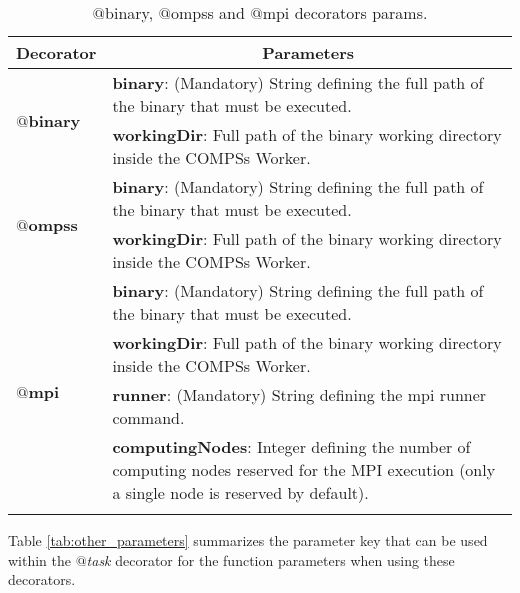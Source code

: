 \bgroup
  \def\arraystretch{1.5}%
  \begin{longtable}{| p{} | p{} |}
    \hline
    \multicolumn{1}{|c|}{{\bf Decorator }} &  \multicolumn{1}{c|}{{\bf Parameters }}\\
    \hline
        \multirow{2}{*}{{\bf $@$binary}} & {\bf binary}: (Mandatory) String defining the full path of the binary that must be executed. \\
                                         & {\bf workingDir}: Full path of the binary working directory inside the COMPSs Worker. \\
    \hline
        \multirow{2}{*}{{\bf $@$ompss}} & {\bf binary}: (Mandatory) String defining the full path of the binary that must be executed. \\
                                        & {\bf workingDir}: Full path of the binary working directory inside the COMPSs Worker. \\
    \hline
        \multirow{4}{*}{{\bf $@$mpi}} & {\bf binary}: (Mandatory) String defining the full path of the binary that must be executed. \\
                                      & {\bf workingDir}: Full path of the binary working directory inside the COMPSs Worker. \\
                                      & {\bf runner}: (Mandatory) String defining the mpi runner command. \\
                                      & {\bf computingNodes}: Integer defining the number of computing nodes reserved for the MPI execution
		                        (only a single node is reserved by default). \\
    \hline
     \caption{$@$binary, $@$ompss and $@$mpi decorators params.}
    \label{tab:other_decorators}
  \end{longtable}
\egroup

Table \ref{tab:other_parameters} summarizes the parameter key that can be used within the {\it $@$task} decorator for the 
function parameters when using these decorators.

